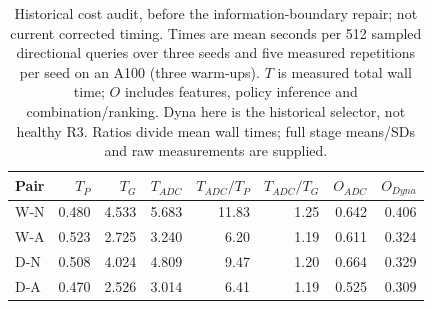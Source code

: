 \begin{table}[htbp]
\centering\footnotesize\setlength{\tabcolsep}{3pt}
\caption{Historical cost audit, before the information-boundary repair; not current corrected timing. Times are mean seconds per 512 sampled directional queries over three seeds and five measured repetitions per seed on an A100 (three warm-ups). $T$ is measured total wall time; $O$ includes features, policy inference and combination/ranking. Dyna here is the historical selector, not healthy R3. Ratios divide mean wall times; full stage means/SDs and raw measurements are supplied.}
\label{tab:claims-cost}
\begin{tabular}{lrrrrrrr}
\toprule
Pair & $T_P$ & $T_G$ & $T_{ADC}$ & $T_{ADC}/T_P$ & $T_{ADC}/T_G$ & $O_{ADC}$ & $O_{Dyna}$\\
\midrule
W-N & 0.480 & 4.533 & 5.683 & 11.83 & 1.25 & 0.642 & 0.406\\
W-A & 0.523 & 2.725 & 3.240 & 6.20 & 1.19 & 0.611 & 0.324\\
D-N & 0.508 & 4.024 & 4.809 & 9.47 & 1.20 & 0.664 & 0.329\\
D-A & 0.470 & 2.526 & 3.014 & 6.41 & 1.19 & 0.525 & 0.309\\
\bottomrule
\end{tabular}
\end{table}
